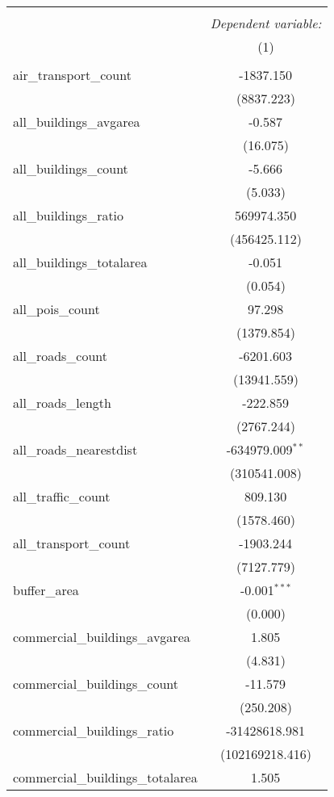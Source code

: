 \begin{table}[!htbp] \centering
\begin{tabular}{@{\extracolsep{5pt}}lc}
\\[-1.8ex]\hline
\hline \\[-1.8ex]
& \multicolumn{1}{c}{\textit{Dependent variable:}} \
\cr \cline{1-2}
\\[-1.8ex] & (1) \\
\hline \\[-1.8ex]
 air_transport_count & -1837.150$^{}$ \\
  & (8837.223) \\
 all_buildings_avgarea & -0.587$^{}$ \\
  & (16.075) \\
 all_buildings_count & -5.666$^{}$ \\
  & (5.033) \\
 all_buildings_ratio & 569974.350$^{}$ \\
  & (456425.112) \\
 all_buildings_totalarea & -0.051$^{}$ \\
  & (0.054) \\
 all_pois_count & 97.298$^{}$ \\
  & (1379.854) \\
 all_roads_count & -6201.603$^{}$ \\
  & (13941.559) \\
 all_roads_length & -222.859$^{}$ \\
  & (2767.244) \\
 all_roads_nearestdist & -634979.009$^{**}$ \\
  & (310541.008) \\
 all_traffic_count & 809.130$^{}$ \\
  & (1578.460) \\
 all_transport_count & -1903.244$^{}$ \\
  & (7127.779) \\
 buffer_area & -0.001$^{***}$ \\
  & (0.000) \\
 commercial_buildings_avgarea & 1.805$^{}$ \\
  & (4.831) \\
 commercial_buildings_count & -11.579$^{}$ \\
  & (250.208) \\
 commercial_buildings_ratio & -31428618.981$^{}$ \\
  & (102169218.416) \\
 commercial_buildings_totalarea & 1.505$^{}$ \\

\end{tabular}
\end{table}
